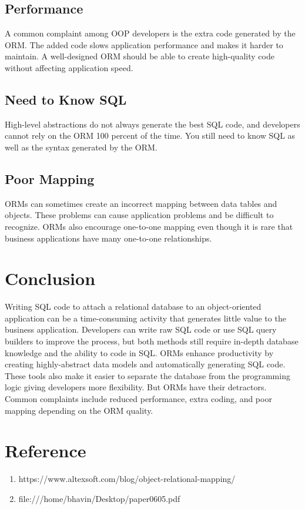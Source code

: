 \documentclass[10pt,a4paper,twoside]{article}
\begin{document}
\subsection{Performance}
\item A common complaint among OOP developers is the extra code generated by the ORM. The added code slows application performance and makes it harder to maintain. A well-designed ORM should be able to create high-quality code without affecting application speed.
\subsection{Need to Know SQL}
\item High-level abstractions do not always generate the best SQL code, and developers cannot rely on the ORM 100 percent of the time. You still need to know SQL as well as the syntax generated by the ORM.
\subsection{Poor Mapping}
\item ORMs can sometimes create an incorrect mapping between data tables and objects. These problems can cause application problems and be difficult to recognize. ORMs also encourage one-to-one mapping even though it is rare that business applications have many one-to-one relationships.


\section{Conclusion}
Writing SQL code to attach a relational database to an object-oriented application can be a time-consuming activity that generates little value to the business application. Developers can write raw SQL code or use SQL query builders to improve the process, but both methods still require in-depth database knowledge and the ability to code in SQL. ORMs enhance productivity by creating highly-abstract data models and automatically generating SQL code. These tools also make it easier to separate the database from the programming logic giving developers more flexibility. But ORMs have their detractors. Common complaints include reduced performance, extra coding, and poor mapping depending on the ORM quality.


\section{Reference}
\begin{enumerate}
\item https://www.altexsoft.com/blog/object-relational-mapping/
\item file:///home/bhavin/Desktop/paper0605.pdf 
\end{enumerate}
\end{document}

